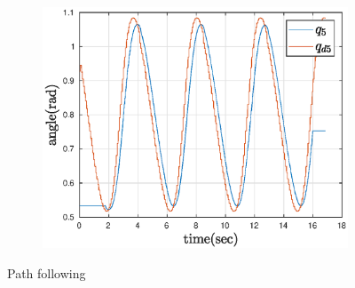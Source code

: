 \begin{figure}[htbp]
\begin{subfigure}[htbp]{0.45\textwidth}
        \centering
        \includegraphics[width = \picsSiz\linewidth]{img/pathF5.eps}
        \caption{ }
    \end{subfigure}
    \caption{Path following}
    \label{fig:pathTS}
\end{figure}




